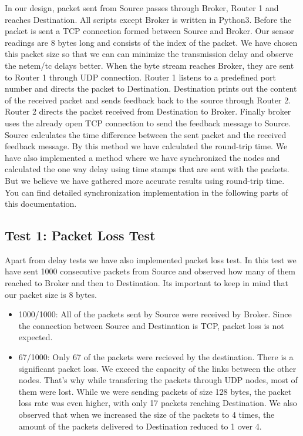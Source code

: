 \documentclass[conference]{IEEEtran}
\begin{document}
In our design, packet sent from Source passes through Broker, Router 1 and reaches Destination. All scripts except Broker is written in Python3. Before the packet is sent a TCP connection formed between Source and Broker. Our sensor readings are 8 bytes long and consists of the index of the packet. We have chosen this packet size so that we can can minimize the transmission delay and observe the netem/tc delays better. When the byte stream reaches Broker, they are sent to Router 1 through UDP connection. Router 1 listens to a predefined port number and directs the packet to Destination. Destination prints out the content of the received packet and sends feedback back to the source through Router 2. Router 2 directs the packet received from Destination to Broker. Finally broker uses the already open TCP connection to send the feedback message to Source. Source calculates the time difference between the sent packet and the received feedback message. By this method we have calculated the round-trip time. We have also implemented a method where we have synchronized the nodes and calculated the one way delay using time stamps that are sent with the packets. But we believe we have gathered more accurate results using round-trip time. You can find detailed synchronization implementation in the following parts of this documentation.

\subsection{Test 1: Packet Loss Test}\label{AA}

Apart from delay tests we have also implemented packet loss test. In this test we have sent 1000 consecutive packets from Source and observed how many of them reached to Broker and then to Destination. Its important to keep in mind that our packet size is 8 bytes. 
\begin{itemize}
\item 1000/1000: All of the packets sent by Source were received by Broker. Since the connection between Source and Destination is TCP, packet loss is not expected.
\item 67/1000: Only 67 of the packets were recieved by the destination. There is a significant packet loss. We exceed the capacity of the links between the other nodes. That's why while transfering the packets through UDP nodes, most of them were lost. While we were sending packets of size 128 bytes, the packet loss rate was even higher, with only 17 packets reaching Destination. We also observed that when we increased the size of the packets to 4 times, the amount of the packets delivered to Destination reduced to 1 over 4.
\end{itemize}
\end{document}
